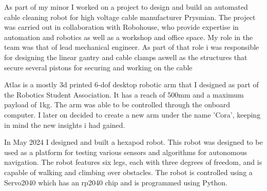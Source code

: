 \documentclass[8pt, a4paper, withhyper]{altacv}
\begin{document}
\begin{paracol}
    \divider

     As part of my
    minor I worked on a project to design and build an automated cable cleaning
    robot for high voltage cable manufacturer Prysmian. 
    The project was carried out in collaboration with
    Robohouse, who provide expertise in automation and robotics as well as a workshop
    and office space. My role in the team was that of lead mechanical engineer. 
    As part of that role i was responsible for designing the linear gantry and
    cable clamps aswell as the structures that secure several pistons for securing and 
    working on the cable

    \divider



     Atlas
    is a mostly 3d printed 6-dof desktop robotic arm that I designed as part of
    the Robotics Student Association. It has a reach of 500mm and a maximum payload
    of 1kg. The arm was able to be controlled through the onboard computer. I later
    on decided to create a new arm under the name 'Cora', keeping in mind
    the new insights i had gained.

    \divider

     In May 2024
    I designed and built a hexapod robot. This robot was designed to be used as
    a platform for testing various sensors and algorithms for autonomous
    navigation. The robot features six legs, each with three degrees of freedom,
    and is capable of walking and climbing over obstacles. The robot is
    controlled using a Servo2040 which has an rp2040 chip and is programmed
    using Python.




\end{paracol}
\end{document}
